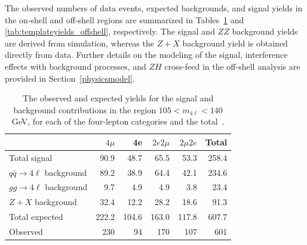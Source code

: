The observed numbers of data events, expected backgrounds, and signal yields in the on-shell and off-shell regions are summarized in Tables~\ref{table:yields_SR} and \ref{tab:templateyields_offshell}, respectively. The signal and $ZZ$ background yields are derived from simulation, whereas the $Z+X$ background yield is obtained directly from data. Further details on the modeling of the \Hboson signal, interference effects with background processes, and $ZH$ cross-feed in the off-shell analysis are provided in Section~\ref{physicsmodel}.

\begin{table}[!hbt] 
\centering
\begin{tabular}{lrrrrr}
   	&	$4\mu$	&	4e	&	$2e2\mu$	&	$2\mu2e$	& Total \\
\hline
Total signal    &       90.9    &       48.7    &       65.5    &       53.3    &       258.4   \\
$q\bar{q}\to4\ell$ background 	&	89.2	&	38.9	&	64.4	&	42.1	&	234.6	\\
$gg\to4\ell$ background	&	9.7	&	4.9	&	4.9	&	3.8	&	23.4	\\
$Z+X$ background	&	32.4	&	12.2	&	28.2	&	18.6	&	91.3	\\
Total expected	&	222.2	&	104.6	&	163.0	&	117.8	&	607.7	\\	
Observed	&	230	&	94	&	170	& 107	&	601	\\
\end{tabular}
\caption{The observed and expected yields for the \Hboson signal and background contributions in the \onshell region $105<m_{4\ell}<140$ GeV, for each of the four-lepton categories and the total~\cite{PhysRevD.111.092014}.}
\label{table:yields_SR}
\end{table}

